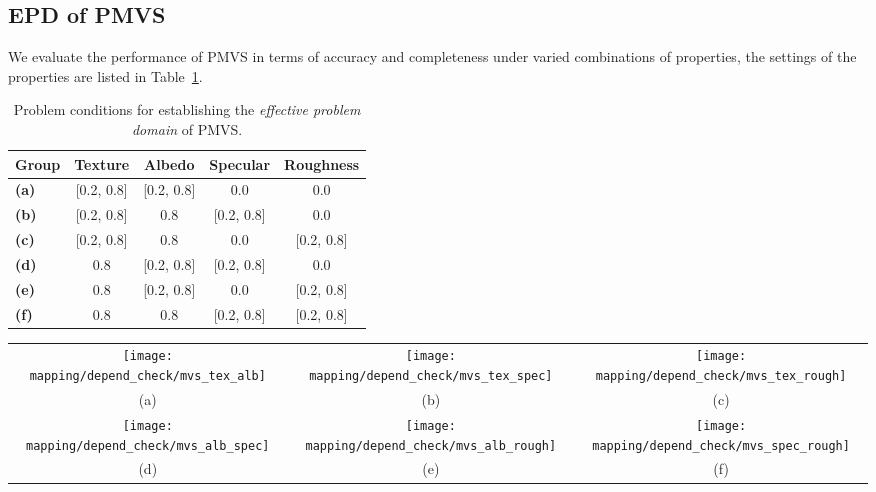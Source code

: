 \subsection{EPD of PMVS}
We evaluate the performance of PMVS in terms of accuracy and completeness under varied combinations of properties, the settings of the properties are listed in Table~\ref{tab:mvs_depend_check_params}.
\begin{table}[!htbp]
  \centering
  \begin{tabular}{l*{4}{c}}
  \hline
  \textbf{Group} & Texture & Albedo & Specular & Roughness\\
  \hline
  \textbf{(a)} & [0.2, 0.8] & [0.2, 0.8] & 0.0 & 0.0\\
  \textbf{(b)} & [0.2, 0.8] & 0.8 & [0.2, 0.8] & 0.0\\
  \textbf{(c)} & [0.2, 0.8] & 0.8 & 0.0 & [0.2, 0.8]\\
  \textbf{(d)} & 0.8 & [0.2, 0.8] & [0.2, 0.8] & 0.0\\
  \textbf{(e)} & 0.8 & [0.2, 0.8] & 0.0 & [0.2, 0.8]\\
  \textbf{(f)} & 0.8 & 0.8 & [0.2, 0.8] & [0.2, 0.8]\\
  \hline
  \end{tabular}
  \caption{Problem conditions for establishing the \textit{effective problem domain} of PMVS.}
  \label{tab:mvs_depend_check_params}
\end{table}

\begin{sidewaysfigure}[!htbp]
\begin{tabular}{ccc}
\texttt{[image: mapping/depend\_check/mvs\_tex\_alb]}&
\texttt{[image: mapping/depend\_check/mvs\_tex\_spec]}&
\texttt{[image: mapping/depend\_check/mvs\_tex\_rough]}\\
(a) & (b) & (c)\\
\texttt{[image: mapping/depend\_check/mvs\_alb\_spec]}&
\texttt{[image: mapping/depend\_check/mvs\_alb\_rough]}&
\texttt{[image: mapping/depend\_check/mvs\_spec\_rough]}\\
(d) & (e) & (f)\\
\end{tabular}
\caption{Performance of PMVS under six pairwise conditions. For instance, (a) shows the performance under changing \textit{texture} and \textit{albedo} values while the others are fixed. The property values are set based on settings in Table~\ref{tab:mvs_depend_check_params}.}
\label{fig:mvs_depend_check}
\end{sidewaysfigure}

